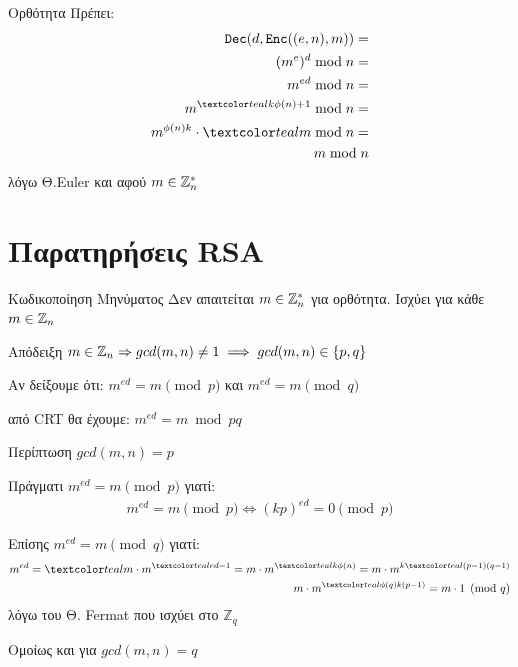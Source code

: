 \documentclass[handout]{beamer}
\begin{document}
\begin{frame}{Ορθότητα}
Πρέπει: 
\pause
\begin{align*} 
\dec(d, \enc((e,n), m)) = \\  
(m^e)^d \bmod n = \\
 m^{ed} \bmod n = \\ 
m^{\green{k\phi(n)+1}} \bmod n = \\ 
m^{\phi(n)k}  \cdot \green{m}  \bmod n = \\ 
m \bmod n
\end{align*}
λόγω Θ.Euler και αφού $m \in \mathbb{Z}^*_n$
\end{frame}

\section{Παρατηρήσεις RSA}
\begin{frame}{Κωδικοποίηση Μηνύματος}
Δεν απαιτείται $m \in \mathbb{Z}^*_n$ για ορθότητα. Ισχύει για κάθε $m \in \mathbb{Z}_n$
\pause
\begin{block}{Απόδειξη}
$m \in \mathbb{Z}_n \Rightarrow gcd(m,n) \neq 1 \implies gcd(m,n) \in \{ p,q \}  $
\pause

Αν δείξουμε ότι: 
$m^{ed} = m \pmod{p}$ και $m^{ed} = m \pmod{q}$

\pause
από CRT θα έχουμε: $m^{ed} = m \bmod{pq}$
\end{block}
\end{frame}

\begin{frame}{Περίπτωση $gcd(m,n)=p$}
\begin{small}

Πράγματι $m^{ed} = m \pmod{p}$ γιατί:
\begin{align*}
m^{ed} = m \pmod{p} \Leftrightarrow (kp)^{ed} = 0 \pmod{p}
\end{align*}

Επίσης $m^{ed} = m \pmod{q}$ γιατί:
\begin{align*}
m^{ed} = \green{m} \cdot m^{\green{ed-1}} = m \cdot m^{\green{k\phi(n)}}=  m \cdot m^{k\green{(p-1)(q-1)}} \\
m \cdot m^{\green{{\phi(q)}}k(p-1)} = m \cdot 1 \pmod{q}
\end{align*}
λόγω του Θ. Fermat που ισχύει στο $\mathbb{Z}_q$ 
\end{small}

Ομοίως και για $gcd(m,n)=q$
\end{frame}
\end{document}
